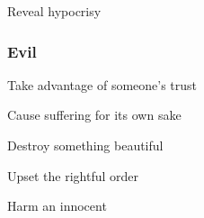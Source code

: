          
\item Reveal hypocrisy

       
\stopitemize
       
\subsubsection{Evil}   
       
\startitemize[1,packed]
         
\item Take advantage of someone's trust

         
\item Cause suffering for its own sake

         
\item Destroy something beautiful

         
\item Upset the rightful order

         
\item Harm an innocent

       
\stopitemize
                
